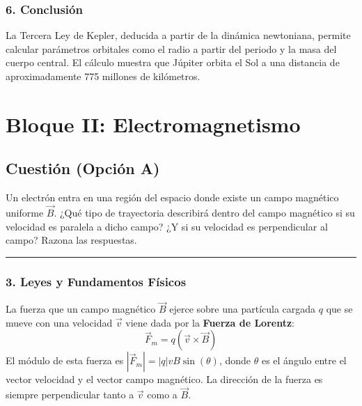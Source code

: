 \subsubsection*{6. Conclusión}
\begin{cajaconclusion}
La Tercera Ley de Kepler, deducida a partir de la dinámica newtoniana, permite calcular parámetros orbitales como el radio a partir del periodo y la masa del cuerpo central. El cálculo muestra que Júpiter orbita el Sol a una distancia de aproximadamente 775 millones de kilómetros.
\end{cajaconclusion}

\newpage

\section{Bloque II: Electromagnetismo}
\label{sec:em_2016_jun_ord}

\subsection{Cuestión (Opción A)}
\label{subsec:A4_2016_jun_ord_re}

\begin{cajaenunciado}
Un electrón entra en una región del espacio donde existe un campo magnético uniforme $\vec{B}$. ¿Qué tipo de trayectoria describirá dentro del campo magnético si su velocidad es paralela a dicho campo? ¿Y si su velocidad es perpendicular al campo? Razona las respuestas.
\end{cajaenunciado}
\hrule

\subsubsection*{3. Leyes y Fundamentos Físicos}
La fuerza que un campo magnético $\vec{B}$ ejerce sobre una partícula cargada $q$ que se mueve con una velocidad $\vec{v}$ viene dada por la \textbf{Fuerza de Lorentz}:
$$ \vec{F}_m = q (\vec{v} \times \vec{B}) $$
El módulo de esta fuerza es $|\vec{F}_m| = |q|vB\sin(\theta)$, donde $\theta$ es el ángulo entre el vector velocidad y el vector campo magnético. La dirección de la fuerza es siempre perpendicular tanto a $\vec{v}$ como a $\vec{B}$.

